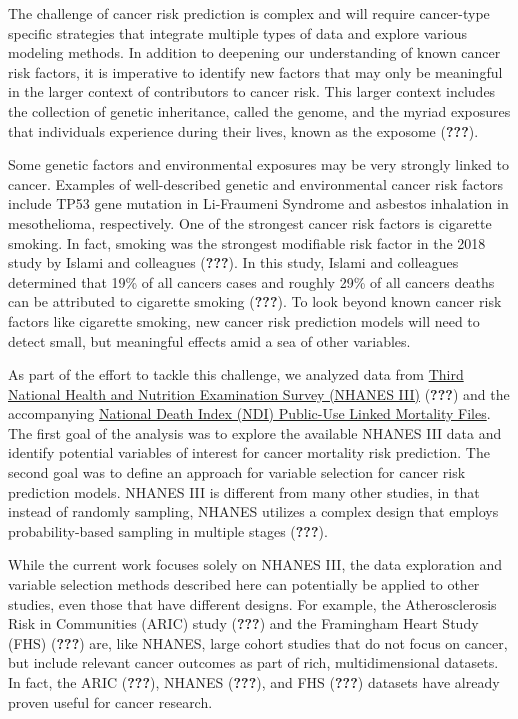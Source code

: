 \documentclass[12pt,twoside]{reedthesis}
\theoremstyle{definition}
\theoremstyle{definition}
\theoremstyle{definition}
\theoremstyle{remark}
\begin{document}
The challenge of cancer risk prediction is complex and will require
cancer-type specific strategies that integrate multiple types of data
and explore various modeling methods. In addition to deepening our
understanding of known cancer risk factors, it is imperative to identify
new factors that may only be meaningful in the larger context of
contributors to cancer risk. This larger context includes the collection
of genetic inheritance, called the genome, and the myriad exposures that
individuals experience during their lives, known as the exposome
({\textbf{???}}).

Some genetic factors and environmental exposures may be very strongly
linked to cancer. Examples of well-described genetic and environmental
cancer risk factors include TP53 gene mutation in Li-Fraumeni Syndrome
and asbestos inhalation in mesothelioma, respectively. One of the
strongest cancer risk factors is cigarette smoking. In fact, smoking was
the strongest modifiable risk factor in the 2018 study by Islami and
colleagues ({\textbf{???}}). In this study, Islami and colleagues
determined that 19\% of all cancers cases and roughly 29\% of all
cancers deaths can be attributed to cigarette smoking ({\textbf{???}}).
To look beyond known cancer risk factors like cigarette smoking, new
cancer risk prediction models will need to detect small, but meaningful
effects amid a sea of other variables.

As part of the effort to tackle this challenge, we analyzed data from
\href{https://wwwn.cdc.gov/nchs/nhanes/nhanes3/DataFiles.aspx}{Third
National Health and Nutrition Examination Survey (NHANES III)}
({\textbf{???}}) and the accompanying
\href{https://www.cdc.gov/nchs/data-linkage/mortality-public.htm}{National
Death Index (NDI) Public-Use Linked Mortality Files}. The first goal of
the analysis was to explore the available NHANES III data and identify
potential variables of interest for cancer mortality risk prediction.
The second goal was to define an approach for variable selection for
cancer risk prediction models. NHANES III is different from many other
studies, in that instead of randomly sampling, NHANES utilizes a complex
design that employs probability-based sampling in multiple stages
({\textbf{???}}).

While the current work focuses solely on NHANES III, the data
exploration and variable selection methods described here can
potentially be applied to other studies, even those that have different
designs. For example, the Atherosclerosis Risk in Communities (ARIC)
study ({\textbf{???}}) and the Framingham Heart Study (FHS)
({\textbf{???}}) are, like NHANES, large cohort studies that do not
focus on cancer, but include relevant cancer outcomes as part of rich,
multidimensional datasets. In fact, the ARIC ({\textbf{???}}), NHANES
({\textbf{???}}), and FHS ({\textbf{???}}) datasets have already proven
useful for cancer research.
\end{document}
